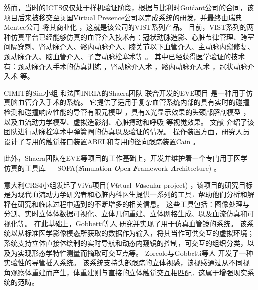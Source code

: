 然而，当时的ICTS仅仅处于样机验证阶段，根据与比利时Guidant公司的合同，该项目后来被移交至英国Virtual Presence公司以完成系统的研发，并最终由瑞典Mentce公司 \cite{menticeweb}将其商业化 \cite{GuidantMenticeNewsWeb,coles2011surveyCRaIVE}，这就是该公司的VIST系列产品。%
目前，VIST系列的两种仿真平台已经能够仿真的血管介入技术有：冠状动脉造影、心脏节律管理、跨室间隔穿刺、肾动脉介入、髂内动脉介入、膝关节以下血管介入、主动脉内窥修复、颈动脉介入、脑血管介入、子宫动脉栓塞术等 \cite{menticeweb}。%
其中已经获得医学验证的技术有：颈动脉介入手术的仿真训练 \cite{Dayal2004VIST,Hsu2004VIST,Nicholson2006VIST,Patel2006VIST,Cates2007VIST,VanHerzeele2009VIST}，肾动脉介入术 \cite{Aggarwal2006,Glaiberman2008VIST}，髂内动脉介入术 \cite{Chaer2006VIST,Berry2007VIST,VanHerzeele2008VIST}，冠状动脉介入术 \cite{Gallagher2006VIST}等。%

CIMIT的Sim小组 \cite{medicalsimweb}和法国INRIA的Shacra团队 \cite{shacraweb}联合开发的EVE项目 \cite{Wu2005EVE}是一种用于仿真脑血管介入手术的系统。
它提供了适用于复杂血管系统内部的具有实时的碰撞检测和碰撞响应性能的导管有限元模型 \cite{dequidt2007EVE,Duriez2006EVE,Lenoir2006EVE,Lenoir2005EVE,Cotin2005EVE}，具有X光显示效果的头颈部解剖模型 \cite{Wu2011EVE,Luboz2005EVE,Muniyandi2003EVE}，以及血流动力学模型、虚拟造影剂、心脏搏动和呼吸 \cite{Wu2007EVE}等视觉效果。%
文献 \cite{Dequidt2008EVE}介绍了该团队进行动脉栓塞术中弹簧圈的仿真以及验证的情况。
操作装置方面，研究人员设计了专用的触觉接口装置ABEL和专用的径向跟踪装置Cain \cite{medicalsimweb}。

此外，Shacra团队在EVE等项目的工作基础上，开发并维护着一个专门用于医学仿真的工具库 --- SOFA(\textbf{\textit{S}}imulation \textbf{\textit{O}}pen \textbf{\textit{F}}ramework \textbf{\textit{A}}rchitecture) \cite{Allard2007SOFA}。%

意大利CRS4小组发起了ViVa项目(\textbf{\textit{Vi}}rtual \textbf{\textit{Va}}scular project) \cite{abdoulaev1998}，该项目的研究目标是为现代血流动力学研究者和心脏内科医生提供一系列的工具，帮助他们分析和解释在研究和临床过程中遇到的不断增多的相关信息。%
这些工具包括：图像处理与分割、实时立体体数据可视化、立体几何重建、立体网格生成、以及血流仿真和可视化等。
在此基础上，Gobbetti等人 \cite{Gobbetti1998}研究并实现了用于仿真血管镜的系统。
该系统以从标准医学影像模态所获取的数据作为输入，将其当作可供交互的虚拟环境；系统支持立体直接体绘制的实时导航和动态内窥镜的控制，可交互的组织分类，以及为实现形态学特性测量而摘取可交互点等。
Zorcolo与Gobbetti等人 \cite{Zorcolo1999,Gobbetti2000,Zorcolo2000}开发了一种实验性的导管插入系统。
该系统支持头部跟踪的立体视感，该视感通过从不同视角观察体重建而产生，体重建则与直接的立体触觉交互相匹配，这属于增强现实系统的范畴。


